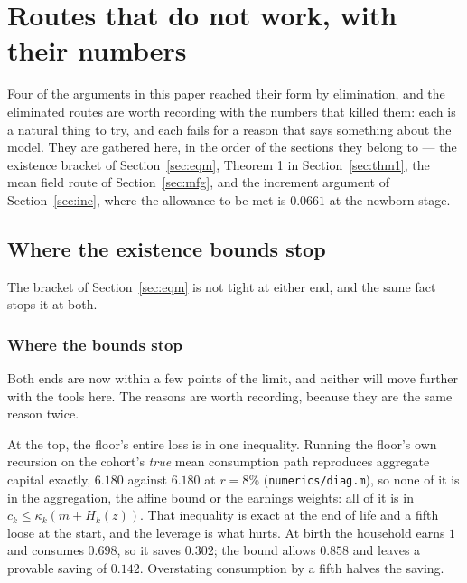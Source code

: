 \section{Routes that do not work, with their numbers}\label{app:routes}

Four of the arguments in this paper reached their form by elimination, and the eliminated routes are
worth recording with the numbers that killed them: each is a natural thing to try, and each fails for a
reason that says something about the model. They are gathered here, in the order of the sections they
belong to --- the existence bracket of Section~\ref{sec:eqm}, Theorem 1 in Section~\ref{sec:thm1}, the
mean field route of Section~\ref{sec:mfg}, and the increment argument of Section~\ref{sec:inc}, where
the allowance to be met is $0.0661$ at the newborn stage.

\subsection*{Where the existence bounds stop}

The bracket of Section~\ref{sec:eqm} is not tight at either end, and the same fact stops it at
both.

\subsubsection*{Where the bounds stop}\label{sec:topwall}

Both ends are now within a few points of the limit, and neither will move further with the tools
here. The reasons are worth recording, because they are the same reason twice.

At the top, the floor's entire loss is in one inequality. Running the floor's own recursion on the
cohort's \emph{true} mean consumption path reproduces aggregate capital exactly, $6.180$ against
$6.180$ at $r=8\%$ (\texttt{numerics/diag.m}), so none of it is in the aggregation, the affine
bound or the earnings weights: all of it is in $c_k\le\kappa_k(m+H_k(z))$. That inequality is
exact at the end of life and a fifth loose at the start, and the leverage is what hurts. At birth
the household earns $1$ and consumes $0.698$, so it saves $0.302$; the bound allows $0.858$ and
leaves a provable saving of $0.142$. Overstating consumption by a fifth halves the saving.

